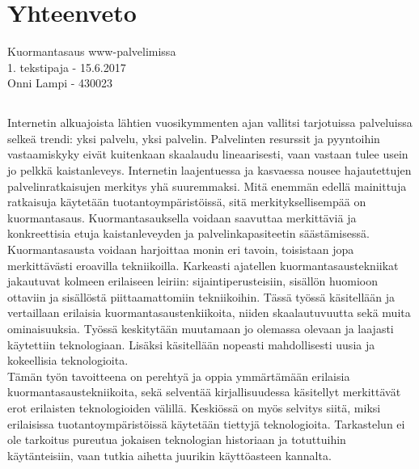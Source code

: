 \documentclass[a4paper, 12pt, finnish]{report}
\begin{document}
\chapter{Yhteenveto}
Kuormantasaus www-palvelimissa\\
1. tekstipaja - 15.6.2017\\
Onni Lampi - 430023

\section*{}

Internetin alkuajoista lähtien vuosikymmenten ajan vallitsi tarjotuissa palveluissa selkeä trendi: yksi palvelu, yksi palvelin.
Palvelinten resurssit ja pyyntoihin vastaamiskyky eivät kuitenkaan skaalaudu lineaarisesti, vaan vastaan tulee usein jo pelkkä kaistanleveys.
Internetin laajentuessa ja kasvaessa nousee hajautettujen palvelinratkaisujen merkitys yhä suuremmaksi.
Mitä enemmän edellä mainittuja ratkaisuja käytetään tuotantoympäristöissä, sitä merkityksellisempää on kuormantasaus.
Kuormantasauksella voidaan saavuttaa merkittäviä ja konkreettisia etuja kaistanleveyden ja palvelinkapasiteetin säästämisessä.\\

Kuormantasausta voidaan harjoittaa monin eri tavoin, toisistaan jopa merkittävästi eroavilla tekniikoilla.
Karkeasti ajatellen kuormantasaustekniikat jakautuvat kolmeen erilaiseen leiriin: sijaintiperusteisiin, sisällön huomioon ottaviin ja sisällöstä piittaamattomiin tekniikoihin.
Tässä työssä käsitellään ja vertaillaan erilaisia kuormantasaustenkiikoita, niiden skaalautuvuutta sekä muita ominaisuuksia.
Työssä keskitytään muutamaan jo olemassa olevaan ja laajasti käytettiin teknologiaan.
Lisäksi käsitellään nopeasti mahdollisesti uusia ja kokeellisia teknologioita.\\
	
Tämän työn tavoitteena on perehtyä ja oppia ymmärtämään erilaisia kuormantasaustekniikoita, sekä selventää kirjallisuudessa käsitellyt merkittävät erot erilaisten teknologioiden välillä.
Keskiössä on myös selvitys siitä, miksi erilaisissa tuotantoympäristöissä käytetään tiettyjä teknologioita.
Tarkastelun ei ole tarkoitus pureutua jokaisen teknologian historiaan ja totuttuihin käytänteisiin, vaan tutkia aihetta juurikin käyttöasteen kannalta.\\
	
\end{document}
